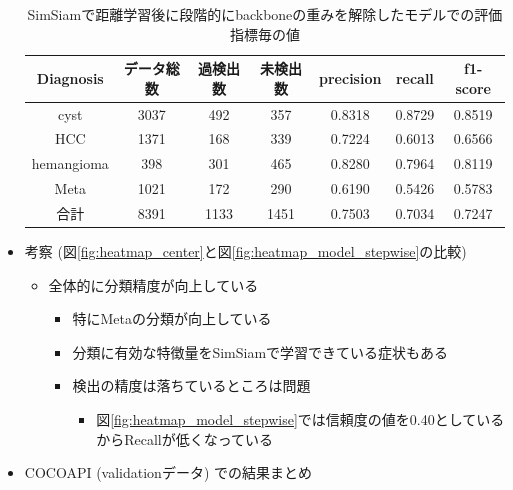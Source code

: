 \documentclass[a4j]{ujarticle}
\newcommand{\Fref}[1]{\mbox{図\ref{fig:#1}}}
\begin{document}
\begin{itemize}
            \begin{table}[!h]
                \centering
                \caption{SimSiam\cite{simsiam}で距離学習後に段階的にbackboneの重みを解除したモデルでの評価指標毎の値}
                \label{tab:metric_center_stepwise}
                \begin{tabular}{c|ccc|ccc}
                    Diagnosis & データ総数 & 過検出数 & 未検出数 & precision & recall & f1-score \\ \hline
                    cyst & 3037 & 492 & 357 & 0.8318 & 0.8729 & 0.8519 \\
                    HCC & 1371 & 168 & 339 & 0.7224 & 0.6013 & 0.6566 \\
                    hemangioma & 398 & 301 & 465 & 0.8280 & 0.7964 & 0.8119 \\
                    Meta & 1021 & 172 & 290 & 0.6190 & 0.5426 & 0.5783 \\ \hline
                    合計 & 8391 & 1133 & 1451 & 0.7503 & 0.7034 & 0.7247
                \end{tabular}
            \end{table}

            \item 考察 (\Fref{heatmap_center}と\Fref{heatmap_model_stepwise}の比較)
            \begin{itemize}
                \item 全体的に分類精度が向上している
                \begin{itemize}
                    \item 特にMetaの分類が向上している
                    \item 分類に有効な特徴量をSimSiam\cite{simsiam}で学習できている症状もある
                    \item 検出の精度は落ちているところは問題
                    \begin{itemize}
                        \item \Fref{heatmap_model_stepwise}では信頼度の値を0.40としているからRecallが低くなっている
                    \end{itemize}
                \end{itemize}
            \end{itemize}
            \item COCOAPI (validationデータ) での結果まとめ


\end{itemize}
\end{document}
